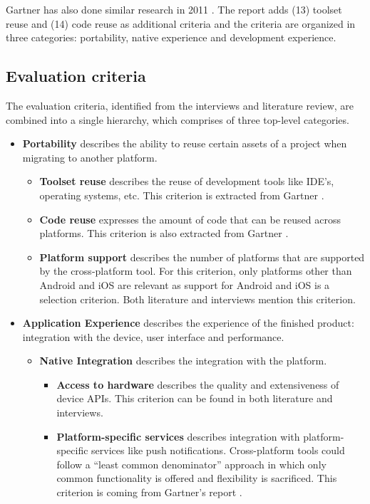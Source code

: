 Gartner has also done similar research in 2011 \cite{Gartner:CPT:2011}. The report adds (13) toolset reuse and (14) code reuse as additional criteria and the criteria are organized in three categories: portability, native experience and development experience.

\subsection{Evaluation criteria}

The evaluation criteria, identified from the interviews and literature review, are combined into a single hierarchy, which comprises of three top-level categories.

\begin{itemize}
    \item \textbf{Portability} describes the ability to reuse certain assets of a project when migrating to another platform.
    \begin{itemize}
        \item \textbf{Toolset reuse} describes the reuse of development tools like IDE's, operating systems, etc. This criterion is extracted from Gartner \cite{Gartner:CPT:2011}.
        \item \textbf{Code reuse} expresses the amount of code that can be reused across platforms. This criterion is also extracted from Gartner \cite{Gartner:CPT:2011}.
        \item \textbf{Platform support} describes the number of platforms that are supported by the cross-platform tool. For this criterion, only platforms other than Android and iOS are relevant as support for Android and iOS is a selection criterion. Both literature \cite{Gartner:CPT:2011, VMCPT:2012} and interviews mention this criterion.
    \end{itemize}
    \item \textbf{Application Experience} describes the experience of the finished product: integration with the device, user interface and performance. 
    \begin{itemize}
        \item \textbf{Native Integration} describes the integration with the platform.
        \begin{itemize}
            \item \textbf{Access to hardware} describes the quality and extensiveness of device APIs. This criterion can be found in both literature and interviews.
            \item \textbf{Platform-specific services} describes integration with platform-specific services like push notifications. Cross-platform tools could follow a ``least common denominator'' approach in which only common functionality is offered and flexibility is sacrificed. This criterion is coming from Gartner's report \cite{Gartner:CPT:2011}.

\end{itemize}
\end{itemize}
\end{itemize}
